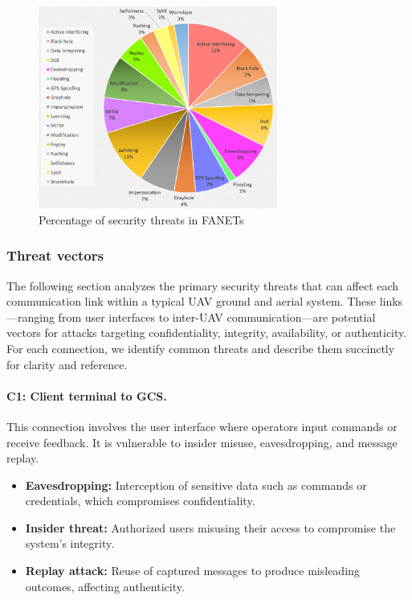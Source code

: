     \begin{figure}[H]
        \centering
        \includegraphics[width=0.7\textwidth]{Figures/Chapter2/Section2/1.png}
        \caption{Percentage of security threats in FANETs~\cite{tsao2022survey}}
        \label{fig:FANET_threats}
    \end{figure}
    

\subsubsection{Threat vectors}








The following section analyzes the primary security threats that can affect each communication link within a typical UAV ground and aerial system. These links—ranging from user interfaces to inter-UAV communication—are potential vectors for attacks targeting confidentiality, integrity, availability, or authenticity. For each connection, we identify common threats and describe them succinctly for clarity and reference.

\paragraph{C1: Client terminal to GCS.}

This connection involves the user interface where operators input commands or receive feedback. It is vulnerable to insider misuse, eavesdropping, and message replay.

\begin{itemize}
    \item \textbf{Eavesdropping:} Interception of sensitive data such as commands or credentials, which compromises confidentiality.
    \item \textbf{Insider threat:} Authorized users misusing their access to compromise the system's integrity.
    \item \textbf{Replay attack:} Reuse of captured messages to produce misleading outcomes, affecting authenticity.
\end{itemize}

